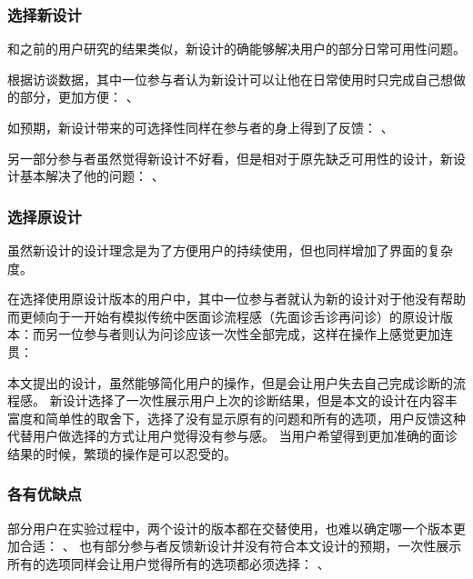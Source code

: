 \subsubsection{选择新设计}

和之前的用户研究的结果类似，新设计的确能够解决用户的部分日常可用性问题。

根据访谈数据，其中一位参与者认为新设计可以让他在日常使用时只完成自己想做的部分，更加方便：
、

如预期，新设计带来的可选择性同样在参与者的身上得到了反馈：
、

另一部分参与者虽然觉得新设计不好看，但是相对于原先缺乏可用性的设计，新设计基本解决了他的问题：
、


\subsubsection{选择原设计}
虽然新设计的设计理念是为了方便用户的持续使用，但也同样增加了界面的复杂度。

在选择使用原设计版本的用户中，其中一位参与者就认为新的设计对于他没有帮助而更倾向于一开始有模拟传统中医面诊流程感（先面诊舌诊再问诊）的原设计版本：而另一位参与者则认为问诊应该一次性全部完成，这样在操作上感觉更加连贯：

本文提出的设计，虽然能够简化用户的操作，但是会让用户失去自己完成诊断的流程感。
新设计选择了一次性展示用户上次的诊断结果，但是本文的设计在内容丰富度和简单性的取舍下，选择了没有显示原有的问题和所有的选项，用户反馈这种代替用户做选择的方式让用户觉得没有参与感。
当用户希望得到更加准确的面诊结果的时候，繁琐的操作是可以忍受的。

\subsubsection{各有优缺点}
部分用户在实验过程中，两个设计的版本都在交替使用，也难以确定哪一个版本更加合适：
、
也有部分参与者反馈新设计并没有符合本文设计的预期，一次性展示所有的选项同样会让用户觉得所有的选项都必须选择：
、

